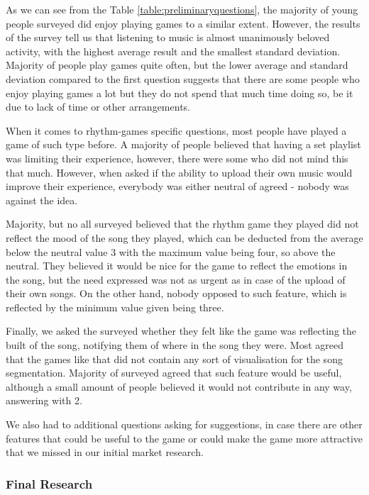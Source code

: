 As we can see from the Table \ref{table:preliminaryquestions}, the majority of young people surveyed did enjoy playing games to a similar extent. However, the results of the survey tell us that listening to music is almost unanimously beloved activity, with the highest average result and the smallest standard deviation. 
Majority of people play games quite often, but the lower average and standard deviation compared to the first question suggests that there are some people who enjoy playing games a lot but they do not spend that much time doing so, be it due to lack of time or other arrangements. 

When it comes to rhythm-games specific questions, most people have played a game of such type before. A majority of people believed that having a set playlist was limiting their experience, however, there were some who did not mind this that much. However, when asked if the ability to upload their own music would improve their experience, everybody was either neutral of agreed - nobody was against the idea. 

Majority, but no all surveyed believed that the rhythm game they played did not reflect the mood of the song they played, which can be deducted from the average below the neutral value 3 with the maximum value being four, so above the neutral. They believed it would be nice for the game to reflect the emotions in the song, but the need expressed was not as urgent as in case of the upload of their own songs. On the other hand, nobody opposed to such feature, which is reflected by the minimum value given being three.

Finally, we asked the surveyed whether they felt like the game was reflecting the built of the song, notifying them of where in the song they were. Most agreed that the games like that did not contain any sort of visualisation for the song segmentation. Majority of surveyed agreed that such feature would be useful, although a small amount of people believed it would not contribute in any way, answering with 2.

We also had to additional questions asking for suggestions, in case there are other features that could be useful to the game or could make the game more attractive that we missed in our initial market research. 

\subsubsection{Final Research}

